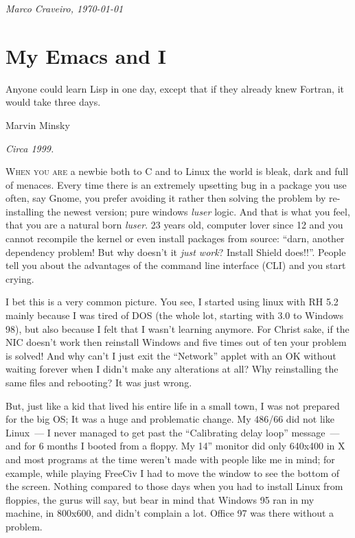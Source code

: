 \documentclass{book}
\begin{document}
\vfill

\begin{flushright}
\emph{Marco Craveiro, \today}
\end{flushright}

\pagestyle{headings}

\chapter{My Emacs and I}

\epigraph{Anyone could learn Lisp in one day, except that if they already
  knew Fortran, it would take three days.}{Marvin Minsky}

\begin{flushright}
  \emph{Circa 1999.}
\end{flushright}

\lettrine{W}{hen you are} a newbie both to C and to Linux the world is
bleak, dark and full of menaces. Every time there is an extremely
upsetting bug in a package you use often, say Gnome, you prefer
avoiding it rather then solving the problem by re-installing the
newest version; pure windows \emph{luser} logic. And that is what you
feel, that you are a natural born \emph{luser}. 23 years old, computer
lover since 12 and you cannot recompile the kernel or even install
packages from source: ``darn, another dependency problem!  But why
doesn't it \emph{just work}?  Install Shield does!!''. People tell you
about the advantages of the command line interface (CLI) and you start
crying.

I bet this is a very common picture. You see, I started using linux
with RH 5.2 mainly because I was tired of DOS (the whole lot, starting
with 3.0 to Windows 98), but also because I felt that I wasn't
learning anymore. For Christ sake, if the NIC doesn't work then
reinstall Windows and five times out of ten your problem is solved!
And why can't I just exit the ``Network'' applet with an OK without
waiting forever when I didn't make any alterations at all? Why
reinstalling the same files and rebooting?  It was just wrong.

But, just like a kid that lived his entire life in a small town, I was
not prepared for the big OS; It was a huge and problematic change. My
486/66 did not like Linux~--- I never managed to get past the
``Calibrating delay loop'' message~--- and for 6 months I booted from
a floppy. My 14'' monitor did only 640x400 in X and most programs at
the time weren't made with people like me in mind; for example, while
playing FreeCiv I had to move the window to see the bottom of the
screen. Nothing compared to those days when you had to install Linux
from floppies, the gurus will say, but bear in mind that Windows 95
ran in my machine, in 800x600, and didn't complain a lot. Office 97
was there without a problem.
\end{document}
